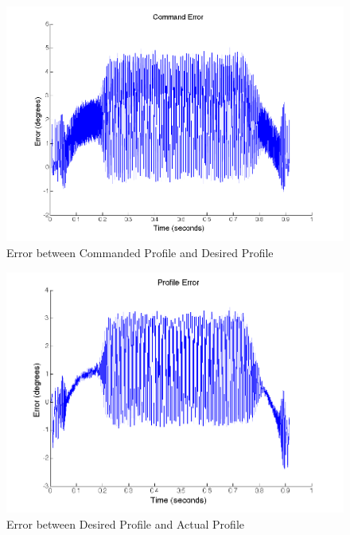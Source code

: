 \documentclass{article}
\newcommand{\xxx}[1]{\textcolor{red}{#1}}
\theoremstyle{plain}
\theoremstyle{definition}
\theoremstyle{remark}
\begin{document}
\begin{figure}[hbt]
\begin{center}
\includegraphics[width = 12cm]{4cCommandError.png}
\caption{Error between Commanded Profile and Desired Profile}
\label{Q4c_CE}
\end{center}
\end{figure}

\begin{figure}[hbt]
\begin{center}
\includegraphics[width = 12cm]{4cProfileError.png}
\caption{Error between Desired Profile and Actual Profile}
\label{Q4c_PE}
\end{center}
\end{figure}

\clearpage





%
\end{document}
